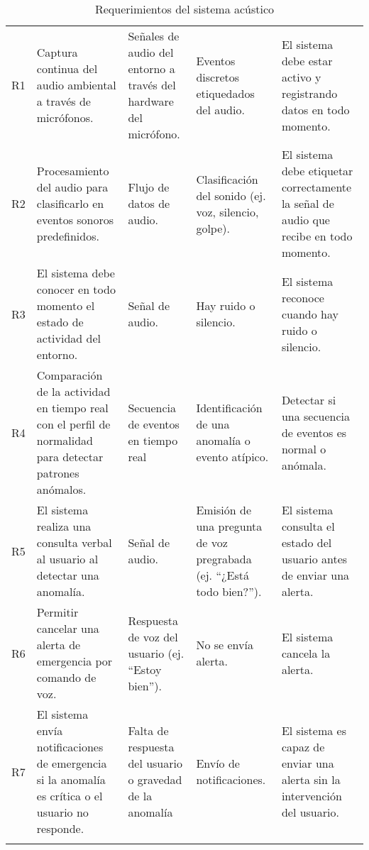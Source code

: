 {\begin{longtable}[c]{c p{3.5cm} p{2.2cm} p{2.2cm} p{3.5cm}}
    R1                     & Captura continua del audio ambiental a través de micrófonos.                                            & Señales de audio del entorno a través del hardware del micrófono. & Eventos discretos etiquedados del audio.                              & El sistema debe estar activo y registrando datos en todo momento.                     \\
    \addlinespace
    R2                     & Procesamiento del audio para clasificarlo en eventos sonoros predefinidos.                              & Flujo de datos de audio.                                          & Clasificación del sonido (ej. voz, silencio, golpe).                  & El sistema debe etiquetar correctamente la señal de audio que recibe en todo momento. \\
    \addlinespace
    R3                     & El sistema debe conocer en todo momento el estado de actividad del entorno.                             & Señal de audio.                                                   & Hay ruido o silencio.                                                 & El sistema reconoce cuando hay ruido o silencio.                                      \\
    \addlinespace
    R4                     & Comparación de la actividad en tiempo real con el perfil de normalidad para detectar patrones anómalos. & Secuencia de eventos en tiempo real                               & Identificación de una anomalía o evento atípico.                      & Detectar si una secuencia de eventos es normal o anómala.                             \\
    \addlinespace
    R5                     & El sistema realiza una consulta verbal al usuario al detectar una anomalía.                             & Señal de audio.                                                   & Emisión de una pregunta de voz pregrabada (ej. ``¿Está todo bien?''). & El sistema consulta el estado del usuario antes de enviar una alerta.                 \\
    \addlinespace
    R6                     & Permitir cancelar una alerta de emergencia por comando de voz.                                          & Respuesta de voz del usuario (ej. ``Estoy bien'').                & No se envía alerta.                                                   & El sistema cancela la alerta.                                                         \\
    \addlinespace
    R7                     & El sistema envía notificaciones de emergencia si la anomalía es crítica o el usuario no responde.       & Falta de respuesta del usuario o gravedad de la anomalía          & Envío de notificaciones.                                              & El sistema es capaz de enviar una alerta sin la intervención del usuario.             \\
    \bottomrule
    \addlinespace

    \caption{Requerimientos del sistema acústico}
    \label{tab:requerimientos_sistema_acustico}
  \end{longtable}
}
